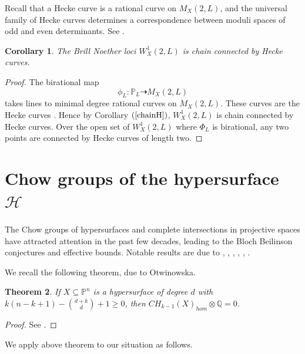 \documentclass[12pt, reqno]{amsart}
\newtheorem{theorem}{Theorem}[section]
\newtheorem{corollary}[theorem]{Corollary}
\begin{document}
Recall that a Hecke curve is a rational curve on  $M_X(2,L)$, and the universal family of Hecke curves determines a correspondence between moduli spaces of odd and even determinants. See \cite{Na-Ra}.

\begin{corollary}\label{Heckechain}
The Brill Noether loci $W^1_X(2,L)$ is chain connected by Hecke curves.
\end{corollary}
\begin{proof}
 The birational map
$$
\phi_L: {\mathbb{P}}_{L}\dashrightarrow M_X(2,L)
$$
takes lines to minimal degree rational curves on $M_X(2,L)$. These curves are the Hecke curves \cite{Hw}.
Hence by Corollary $(\ref{chainH})$, $W^1_X(2,L)$ is chain connected by Hecke curves. Over the open set  of $W^1_X(2,L)$ where $\Phi_L$ is birational, any two points are connected by Hecke curves of length two.
\end{proof}




\section{Chow groups of the hypersurface $\mathcal{H}$}

The Chow groups of hypersurfaces and complete intersections in projective spaces have attracted 
attention in the past few decades, leading to the Bloch Beilinson conjectures and effective bounds. Notable results are due to \cite{Ro}, \cite{N}, \cite{P}, \cite{elv}, \cite{o}, \cite{hi}.


We recall the following theorem, due to Otwinowska.


\begin{theorem}\label{4.2}
If $X\subseteq \mathbb{P}^{n}$ is a hypersurface of degree $d$ with $k(n-k+1)-\binom{d+k}{d}+1\geq 0$, then $CH_{k-1}(X)_{hom}\otimes \mathbb{Q}=0$.
\end{theorem}
\begin{proof}
See \cite[Corollary $(1)$]{o}.
\end{proof}

We apply above theorem to our situation as follows.
\end{document}
